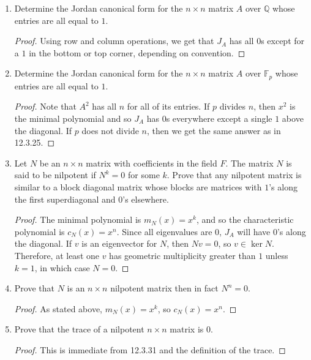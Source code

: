 \documentclass{report}
\newcommand{\Q}{\mathbb{Q}}
\newcommand{\F}{\mathbb{F}}
\begin{document}
\begin{enumerate}
\begin{proof}
			Since $m_A(x)$ is degree $2$, it is also the characteristic polynomial. Letting $\omega$ be a primitive $3^{rd}$ root of unity, we have:
			$$R_A=\begin{pmatrix}0&-1\\1&-1\end{pmatrix}\text{ and }J_A=\begin{pmatrix}\omega&0\\0&\omega^2\end{pmatrix}.$$
		\end{proof}
		\setcounter{enumi}{24}
	\item Determine the Jordan canonical form for the $n\times n$ matrix $A$ over $\Q$ whose entries are all equal to $1$.
		\begin{proof}
			Using row and column operations, we get that $J_A$ has all $0$s except for a $1$ in the bottom or top corner, depending on convention.
		\end{proof}
	\item Determine the Jordan canonical form for the $n\times n$ matrix $A$ over $\F_p$ whose entries are all equal to $1$.
		\begin{proof}
			Note that $A^2$ has all $n$ for all of its entries. If $p$ divides $n$, then $x^2$ is the minimal polynomial and so $J_A$ has $0$s everywhere except a single $1$ above the diagonal.
			If $p$ does not divide $n$, then we get the same answer as in 12.3.25.
		\end{proof}
		\setcounter{enumi}{30}
	\item Let $N$ be an $n\times n$ matrix with coefficients in the field $F$. The matrix $N$ is said to be nilpotent if $N^k=0$ for some $k$.
		Prove that any nilpotent matrix is similar to a block diagonal matrix whose blocks are matrices with $1$'s along the first superdiagonal and $0$'s elsewhere.
		\begin{proof}
			The minimal polynomial is $m_N(x)=x^k$, and so the characteristic polynomial is $c_N(x)=x^n$. 
			Since all eigenvalues are $0$, $J_A$ will have $0$'s along the diagonal.
			If $v$ is an eigenvector for $N$, then $Nv=0$, so $v\in\ker N$. 
			Therefore, at least one $v$ has geometric multiplicity greater than $1$ unless $k=1$, in which case $N=0$.
		\end{proof}
	\item Prove that $N$ is an $n\times n$ nilpotent matrix then in fact $N^n=0$.
		\begin{proof}
			As stated above, $m_N(x)=x^k$, so $c_N(x)=x^n$. 
		\end{proof}
		\setcounter{enumi}{33}
	\item Prove that the trace of a nilpotent $n\times n$ matrix is $0$.
		\begin{proof}
			This is immediate from 12.3.31 and the definition of the trace.
		\end{proof}
\end{enumerate}
\end{document}
